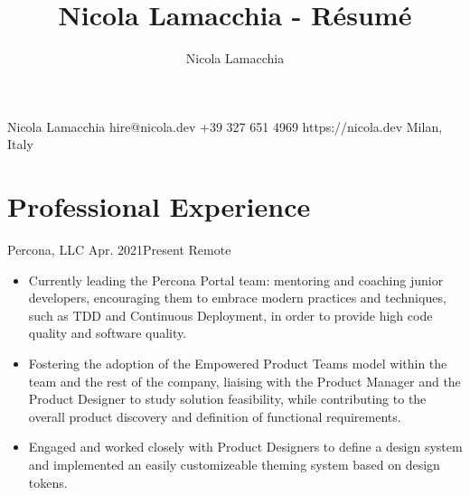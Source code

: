 \documentclass{resume}
\title{Nicola Lamacchia - Résumé}
\author{Nicola Lamacchia}
\begin{document}
\heading%
    {Nicola}
    {Lamacchia}
    {}
    {hire@nicola.dev}%
    {+39 327 651 4969}%
    {https://nicola.dev}
    {Milan, Italy}

\separator[cvlightgray]


\section{Professional Experience}

\begin{cvsection}
        {Percona, LLC}%
        {Apr. 2021}{Present}%
        {Remote}%
        {%
            \begin{itemize}
                \item Currently leading the Percona Portal team: mentoring and
                    coaching junior developers, encouraging them to embrace
                    modern practices and techniques, such as TDD and Continuous
                    Deployment, in order to provide high code quality and
                    software quality.
                \item Fostering the adoption of the Empowered Product Teams
                    model within the team and the rest of the company, liaising
                    with the Product Manager and the Product Designer to
                    study solution feasibility, while contributing to the
                    overall product discovery and definition of functional
                    requirements.
                \item Engaged and worked closely with Product Designers to
                    define a design system and implemented an easily
                    customizeable theming system based on design tokens.
            \end{itemize}
        }


\end{cvsection}
\end{document}
